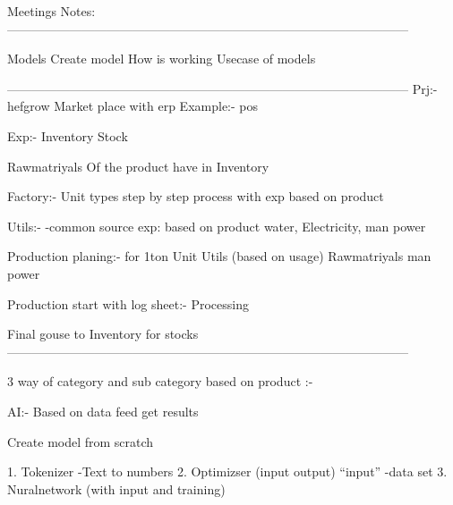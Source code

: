 
Meetings Notes: ————————————————————————————————

Models 
Create model  How is working 
Usecase of models 

————————————————————————————————
Prj:- hefgrow
Market place with erp
Example:- pos

Exp:-
Inventory
Stock	

Rawmatriyals Of the product  have in Inventory

Factory:-
Unit types step by step process with exp based on product


Utils:-
-common source	exp: based on product water, Electricity, man power 



Production planing:- for 1ton
Unit
Utils (based on usage)
Rawmatriyals
man power 

Production start with log sheet:-
Processing

Final  gouse to Inventory for stocks
————————————————————————————————


3 way of category and sub category based on product :-


AI:- Based on data feed get results

Create model from scratch

1. Tokenizer -Text to numbers 
2. Optimizser (input output) “input” -data set 
3. Nuralnetwork (with input and training)



  
